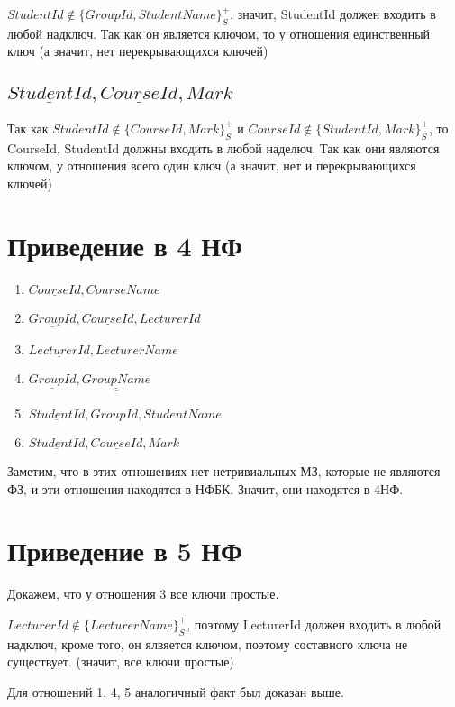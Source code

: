 \documentclass{article}
\begin{document}
	$StudentId \not\in \{GroupId, StudentName\}_S^+$, значит, StudentId должен входить в любой надключ. Так как он является ключом, то у отношения единственный ключ (а значит, нет перекрывающихся ключей)
	
	\subsection{ $\underline{StudentId}, \underline{CourseId}, Mark$}
	
	Так как $StudentId \not\in \{CourseId, Mark\}_S^+$ и $CourseId \not\in \{StudentId, Mark\}_S^+$, то CourseId, StudentId должны входить в любой наделюч. Так как они являются ключом, у отношения всего один ключ (а значит, нет и перекрывающихся ключей) 
	
	\section{Приведение в 4 НФ}
	
	\begin{enumerate}
		\item $\underline{CourseId}, CourseName$
		\item $\underline{GroupId}, \underline{CourseId}, LecturerId$
		\item $\underline{LecturerId}, LecturerName$
		\item $\underline{GroupId}, \underline{\underline{GroupName}}$
		\item $\underline{StudentId}, GroupId, StudentName$
		\item $\underline{StudentId}, \underline{CourseId}, Mark$
	\end{enumerate}

	Заметим, что в этих отношениях нет нетривиальных МЗ, которые не являются ФЗ, и эти отношения находятся в НФБК. Значит, они находятся в 4НФ.
	
	\section{Приведение в 5 НФ}
	
	Докажем, что у отношения 3 все ключи простые.
	
	$LecturerId \not\in \{LecturerName\}_S^+$, поэтому LecturerId должен входить в любой надключ, кроме того, он ялвяется ключом, поэтому составного ключа не существует. (значит, все ключи простые)
	
	Для отношений 1, 4, 5 аналогичный факт был доказан выше.
	
\end{document}
